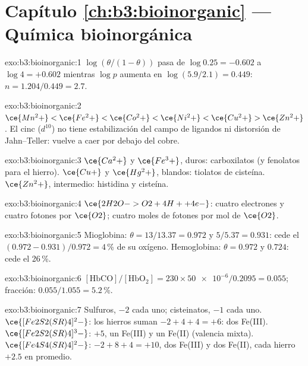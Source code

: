 \section*{Capítulo \ref{ch:b3:bioinorganic} --- Química bioinorgánica}

\begin{solution}{exo:b3:bioinorganic:1}
$\log(\theta/(1 - \theta))$ pasa de $\log 0.25 = -0.602$ a $\log 4 = +0.602$ mientras $\log p$ aumenta en
$\log(5.9/2.1) = 0.449$: $n = 1.204/0.449 = 2.7$.
\end{solution}

\begin{solution}{exo:b3:bioinorganic:2}
$\ce{Mn^2+} < \ce{Fe^2+} < \ce{Co^2+} < \ce{Ni^2+} < \ce{Cu^2+} > \ce{Zn^2+}$. El cinc ($d^{10}$) no tiene estabilización del campo de ligandos ni
distorsión de Jahn--Teller: vuelve a caer por debajo del cobre.
\end{solution}

\begin{solution}{exo:b3:bioinorganic:3}
$\ce{Ca^2+}$ y $\ce{Fe^3+}$, duros: carboxilatos (y fenolatos para el hierro). $\ce{Cu+}$ y $\ce{Hg^2+}$, blandos:
tiolatos de cisteína. $\ce{Zn^2+}$, intermedio: histidina y cisteína.
\end{solution}

\begin{solution}{exo:b3:bioinorganic:4}
$\ce{2H2O -> O2 + 4H+ + 4e-}$: cuatro electrones y cuatro fotones por $\ce{O2}$; cuatro moles de fotones por
mol de $\ce{O2}$.
\end{solution}

\begin{solution}{exo:b3:bioinorganic:5}
Mioglobina: $\theta = 13/13.37 = 0.972$ y $5/5.37 = 0.931$: cede el $(0.972 - 0.931)/0.972 = 4$\,\% de su
oxígeno. Hemoglobina: $\theta = 0.972$ y $0.724$: cede el 26\,\%.
\end{solution}

\begin{solution}{exo:b3:bioinorganic:6}
$[\mathrm{HbCO}]/[\mathrm{HbO_2}] = 230 \times \num{50e-6}/0.2095 = 0.055$; fracción: $0.055/1.055 = 5.2$\,\%.
\end{solution}

\begin{solution}{exo:b3:bioinorganic:7}
Sulfuros, $-2$ cada uno; cisteinatos, $-1$ cada uno. $\ce{[Fe2S2(SR)4]^2-}$: los hierros suman $-2 + 4 + 4 = +6$: dos
Fe(III). $\ce{[Fe2S2(SR)4]^3-}$: $+5$, un Fe(III) y un Fe(II) (valencia mixta). $\ce{[Fe4S4(SR)4]^2-}$:
$-2 + 8 + 4 = +10$, dos Fe(III) y dos Fe(II), cada hierro $+2.5$ en promedio.
\end{solution}

